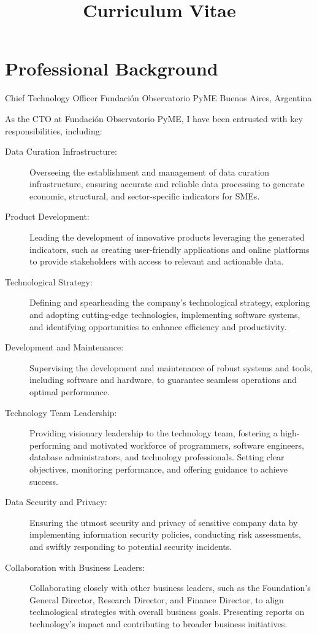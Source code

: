 \documentclass[9pt,a4paper,sans]{moderncv}
\title{Curriculum Vitae}
\newcommand{\actual}{$\infty$}
\begin{document}
\makecvtitle

\section{Professional Background}\label{profesional:desde}

\cventry{2022-\actual}
	{Chief Technology Officer}
	{Fundación Observatorio PyME}
	{Buenos Aires, Argentina}
	{}
	{
        As the CTO at Fundación Observatorio PyME, I have been entrusted with key responsibilities, including:
	\begin{description}
        \item [Data Curation Infrastructure:] Overseeing the establishment and management of data curation infrastructure, ensuring accurate and reliable data processing to generate economic, structural, and sector-specific indicators for SMEs.
        \item [Product Development:] Leading the development of innovative products leveraging the generated indicators, such as creating user-friendly applications and online platforms to provide stakeholders with access to relevant and actionable data.
        \item [Technological Strategy:] Defining and spearheading the company's technological strategy, exploring and adopting cutting-edge technologies, implementing software systems, and identifying opportunities to enhance efficiency and productivity.
        \item [Development and Maintenance:] Supervising the development and maintenance of robust systems and tools, including software and hardware, to guarantee seamless operations and optimal performance.
        \item [Technology Team Leadership:] Providing visionary leadership to the technology team, fostering a high-performing and motivated workforce of programmers, software engineers, database administrators, and technology professionals. Setting clear objectives, monitoring performance, and offering guidance to achieve success.
        \item [Data Security and Privacy:] Ensuring the utmost security and privacy of sensitive company data by implementing information security policies, conducting risk assessments, and swiftly responding to potential security incidents.
        \item [Collaboration with Business Leaders:] Collaborating closely with other business leaders, such as the Foundation's General Director, Research Director, and Finance Director, to align technological strategies with overall business goals. Presenting reports on technology's impact and contributing to broader business initiatives.

\end{description}}
\end{document}

